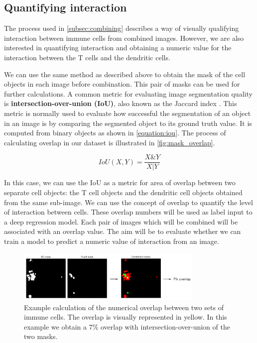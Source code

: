 \subsection{Quantifying interaction}

The process used in \autoref{subsec:combining} describes a way of visually qualifying interaction between immune cells from combined images. However, we are also interested in quantifying interaction and obtaining a numeric value for the interaction between the T cells and the dendritic cells.

We can use the same method as described above to obtain the mask of the cell objects in each image before combination. This pair of masks can be used for further calculations. A common metric for evaluating image segmentation quality is \textbf{intersection-over-union (IoU)}, also known as the Jaccard index \citep{rahman_optimizing_2016, rezatofighi_generalized_2019, beers_deep_2019}. This metric is normally used to evaluate how successful the segmentation of an object in an image is by comparing the segmented object to its ground truth value. It is computed from binary objects as shown in \autoref{equation:iou}. The process of calculating overlap in our dataset is illustrated in \autoref{fig:mask_overlap}.

\begin{equation}
    IoU(X,Y) = \frac{X \& Y}{X | Y}
    \label{equation:iou}
\end{equation}

In this case, we can use the IoU as a metric for area of overlap between two separate cell objects: the T cell objects and the dendritic cell objects obtained from the same sub-image. We can use the concept of overlap to quantify the level of interaction between cells. These overlap numbers will be used as label input to a deep regression model. Each pair of images which will be combined will be associated with an overlap value. The aim will be to evaluate whether we can train a model to predict a numeric value of interaction from an image.

\begin{figure}[h!]
    \centering
    \includegraphics[width=0.8\textwidth]{dissertation/figures/mask_overlap_operation.png}
    \caption{Example calculation of the numerical overlap between two sets of immune cells. The overlap is visually represented in yellow. In this example we obtain a 7\% overlap with intersection-over-union of the two masks.}
    \label{fig:mask_overlap}
\end{figure}

